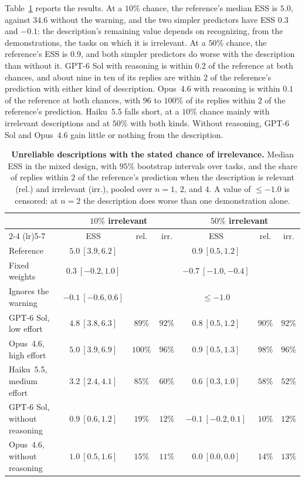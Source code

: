 \documentclass{article}
\theoremstyle{definition}
\begin{document}
Table~\ref{tab:matched} reports the results. At a $10\%$ chance, the reference's median ESS is $5.0$, against $34.6$ without the warning, and the two simpler predictors have ESS $0.3$ and $-0.1$: the description's remaining value depends on recognizing, from the demonstrations, the tasks on which it is irrelevant. At a $50\%$ chance, the reference's ESS is $0.9$, and both simpler predictors do worse with the description than without it. GPT-6 Sol with reasoning is within $0.2$ of the reference at both chances, and about nine in ten of its replies are within $2$ of the reference's prediction with either kind of description. Opus~4.6 with reasoning is within $0.1$ of the reference at both chances, with $96$ to $100\%$ of its replies within $2$ of the reference's prediction. Haiku~5.5 falls short, at a $10\%$ chance mainly with irrelevant descriptions and at $50\%$ with both kinds. Without reasoning, GPT-6 Sol and Opus~4.6 gain little or nothing from the description.

\begin{table}[!htb]
\centering\small
\setlength{\tabcolsep}{3.5pt}
\caption{\textbf{Unreliable descriptions with the stated chance of irrelevance.} Median ESS in the mixed design, with $95\%$ bootstrap intervals over tasks, and the share of replies within $2$ of the reference's prediction when the description is relevant (rel.) and irrelevant (irr.), pooled over $n=1$, $2$, and $4$. A value of $\le-1.0$ is censored: at $n=2$ the description does worse than one demonstration alone.}
\label{tab:matched}
\vspace{3pt}
\begin{tabular}{lcccccc}
\toprule
& \multicolumn{3}{c}{$10\%$ irrelevant} & \multicolumn{3}{c}{$50\%$ irrelevant} \\
\cmidrule(lr){2-4} \cmidrule(lr){5-7}
& ESS & rel. & irr. & ESS & rel. & irr. \\
\midrule
Reference & $5.0\ [3.9,6.2]$ & & & $0.9\ [0.5,1.2]$ & & \\
Fixed weights & $0.3\ [-0.2,1.0]$ & & & $-0.7\ [-1.0,-0.4]$ & & \\
Ignores the warning & $-0.1\ [-0.6,0.6]$ & & & $\le-1.0$ & & \\
\midrule
GPT-6 Sol, low effort & $4.8\ [3.8,6.3]$ & $89\%$ & $92\%$ & $0.8\ [0.5,1.2]$ & $90\%$ & $92\%$ \\
Opus~4.6, high effort & $5.0\ [3.9,6.9]$ & $100\%$ & $96\%$ & $0.9\ [0.5,1.3]$ & $98\%$ & $96\%$ \\
Haiku~5.5, medium effort & $3.2\ [2.4,4.1]$ & $85\%$ & $60\%$ & $0.6\ [0.3,1.0]$ & $58\%$ & $52\%$ \\
GPT-6 Sol, without reasoning & $0.9\ [0.6,1.2]$ & $19\%$ & $12\%$ & $-0.1\ [-0.2,0.1]$ & $10\%$ & $12\%$ \\
Opus~4.6, without reasoning & $1.0\ [0.5,1.6]$ & $15\%$ & $11\%$ & $0.0\ [0.0,0.0]$ & $14\%$ & $13\%$ \\
\bottomrule
\end{tabular}
\end{table}
\end{document}
